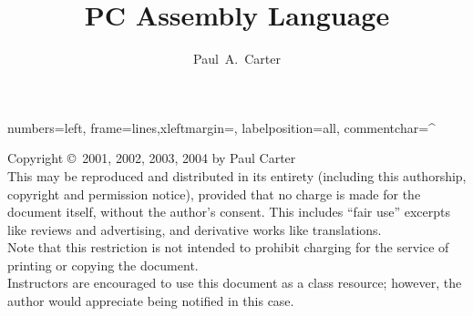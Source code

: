 \documentclass[11pt]{book}
\author{Paul~A.~Carter}
\title{PC Assembly Language}
\newif\ifmypdf
\begin{document}
\maketitle
\newlength{\AsmMargin}
\setlength{\AsmMargin}{-1cm}
{numbers=left, frame=lines,xleftmargin=\AsmMargin, labelposition=all, commentchar=^ }

\newcommand{\MarginNote}[1]{\marginpar{\sloppy \em \small #1}}
\thispagestyle{empty}
\vspace*{\fill}
\noindent Copyright \copyright\  2001, 2002, 2003, 2004 by Paul Carter\\

\noindent This may be reproduced and distributed in its entirety 
(including this authorship, copyright and permission notice), provided 
that no charge is made for the document itself, without the author's 
consent. This includes ``fair use'' excerpts like reviews and advertising, 
and derivative works like translations.\\

\noindent Note that this restriction is not intended to prohibit charging for
the service of printing or copying the document.\\

\noindent Instructors are encouraged to use this document as a class 
resource; however, the author would appreciate being notified in this
case.


\vfill
\frontmatter


\mainmatter







%
\begin{appendix}

\end{appendix}
\clearpage
\ifmypdf
\phantomsection %
\fi
{}
\printindex
\end{document}
